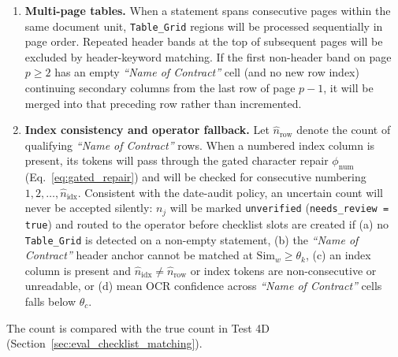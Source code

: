 \begin{enumerate}
\begin{itemize}
        \item \emph{Wrapped continuation rows:} Any horizontal text band below an active contract row whose \emph{``Name of Contract''} cell is empty while secondary columns (such as address, dates, or values) contain text---or whose vertical offset falls within the intra-cell wrapping threshold $\Delta y_{\mathrm{cont}}$ without a new row index---will be merged into the preceding contract row rather than counted separately.
    \end{itemize}
    \item \textbf{Multi-page tables.} When a statement spans consecutive pages within the same document unit, \texttt{Table\_Grid} regions will be processed sequentially in page order. Repeated header bands at the top of subsequent pages will be excluded by header-keyword matching. If the first non-header band on page $p \ge 2$ has an empty \emph{``Name of Contract''} cell (and no new row index) continuing secondary columns from the last row of page $p - 1$, it will be merged into that preceding row rather than incremented.
    \item \textbf{Index consistency and operator fallback.} Let $\hat{n}_{\mathrm{row}}$ denote the count of qualifying \emph{``Name of Contract''} rows. When a numbered index column is present, its tokens will pass through the gated character repair $\phi_{\mathrm{num}}$ (Eq.~\eqref{eq:gated_repair}) and will be checked for consecutive numbering $1, 2, \dots, \hat{n}_{\mathrm{idx}}$. Consistent with the date-audit policy, an uncertain count will never be accepted silently: $n_j$ will be marked \texttt{unverified} (\texttt{needs\_review = true}) and routed to the operator before checklist slots are created if (a) no \texttt{Table\_Grid} is detected on a non-empty statement, (b) the \emph{``Name of Contract''} header anchor cannot be matched at $\mathrm{Sim}_w \ge \theta_k$, (c) an index column is present and $\hat{n}_{\mathrm{idx}} \ne \hat{n}_{\mathrm{row}}$ or index tokens are non-consecutive or unreadable, or (d) mean OCR confidence across \emph{``Name of Contract''} cells falls below $\theta_c$.
\end{enumerate}

The count is compared with the true count in Test 4D (Section~\ref{sec:eval_checklist_matching}).

